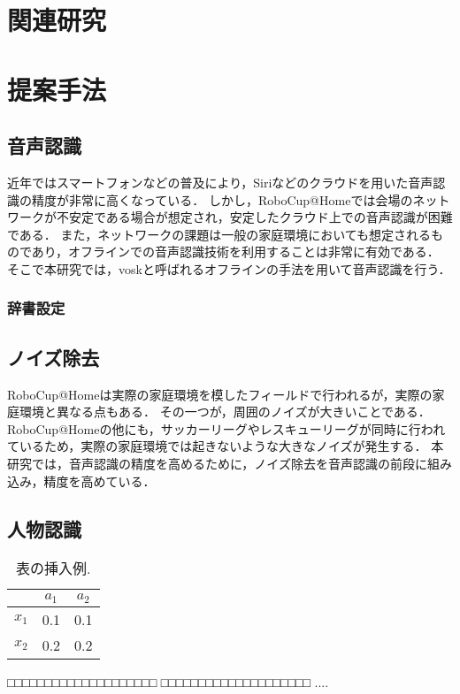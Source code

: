 \documentclass[a4j]{jarticle}
\begin{document}
\section{関連研究}


\section{提案手法}

\subsection{音声認識}
近年ではスマートフォンなどの普及により，Siriなどのクラウドを用いた音声認識の精度が非常に高くなっている．
しかし，RoboCup@Homeでは会場のネットワークが不安定である場合が想定され，安定したクラウド上での音声認識が困難である．
また，ネットワークの課題は一般の家庭環境においても想定されるものであり，オフラインでの音声認識技術を利用することは非常に有効である．
そこで本研究では，vosk\cite{vosk_hp}と呼ばれるオフラインの手法を用いて音声認識を行う．

\subsubsection{辞書設定}


\subsection{ノイズ除去}
RoboCup@Homeは実際の家庭環境を模したフィールドで行われるが，実際の家庭環境と異なる点もある．
その一つが，周囲のノイズが大きいことである．
RoboCup@Homeの他にも，サッカーリーグやレスキューリーグが同時に行われているため，実際の家庭環境では起きないような大きなノイズが発生する．
本研究では，音声認識の精度を高めるために，ノイズ除去\cite{sainburg2020finding}を音声認識の前段に組み込み，精度を高めている．


\subsection{人物認識}


\begin{table}[h]
  \centering
  \caption {表の挿入例.}
  \label{table:ex1}
  \begin{tabular}{c|cc}
    \hline
           & $a_1$ & $a_2$ \\ \hline
    $x_1$  &  0.1  &  0.1  \\
    $x_2$  &  0.2  &  0.2  \\ \hline
  \end{tabular}
\end{table}
%
□□□□□□□□□□□□□□□□□□□□
□□□□□□□□□□□□□□□□□□□□
....
\end{document}
